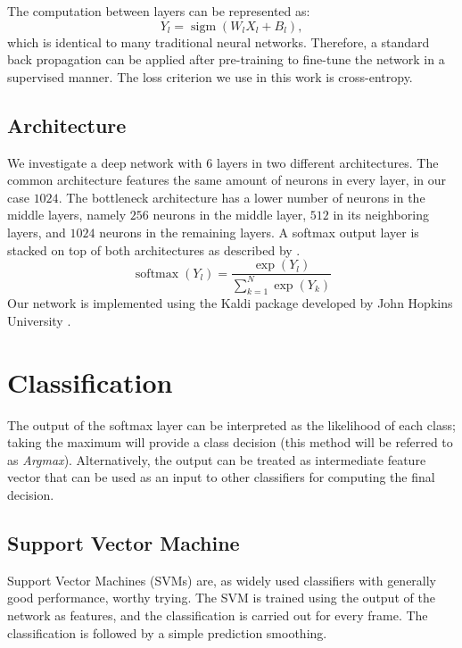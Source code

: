 \documentclass{article}
\DeclareMathOperator*{\sigm}{sigm}
\DeclareMathOperator*{\softmax}{softmax}
\begin{document}
The computation between layers can be represented as:
\begin{equation}\label{dbn}
Y_{l} = \sigm(W_{l}X_{l} + B_{l}) ,
\end{equation}  
which is identical to many traditional neural networks. Therefore, a standard back propagation can be applied after pre-training to fine-tune the network in a supervised manner. The loss criterion we use in this work is cross-entropy.  

\subsection{Architecture}\label{sec:arch}
We investigate a deep network with $6$ layers in two different architectures. The common architecture features the same amount of neurons in every layer, in our case $1024$. The bottleneck architecture has a lower number of neurons in the middle layers, namely $256$ neurons in the middle layer, $512$ in its neighboring layers, and $1024$ neurons in the remaining layers\cite{grezl2007probabilistic}.
A softmax output layer is stacked on top of both architectures as described by .
\begin{equation}\label{softmax}
\softmax(Y_{l}) = \frac{\exp(Y_{l})}{\sum_{k=1}^N \exp(Y_{k})}
\end{equation}
Our network is implemented using the Kaldi package developed by John Hopkins University \cite{povey2011kaldi}.
 
\section{Classification}\label{sec:class}
The output of the softmax layer can be interpreted as the likelihood of each class; taking the maximum will provide a class decision (this method will be referred to as \textit{Argmax}). Alternatively, the output can be treated as intermediate feature vector that can be used as an input to other classifiers for computing the final decision. 
\subsection{Support Vector Machine}
Support Vector Machines (SVMs) are, as widely used classifiers with generally good performance, worthy trying. The SVM is trained using the output of the network as features, and the classification is carried out for every frame. The classification is followed by a simple prediction smoothing.
\end{document}
